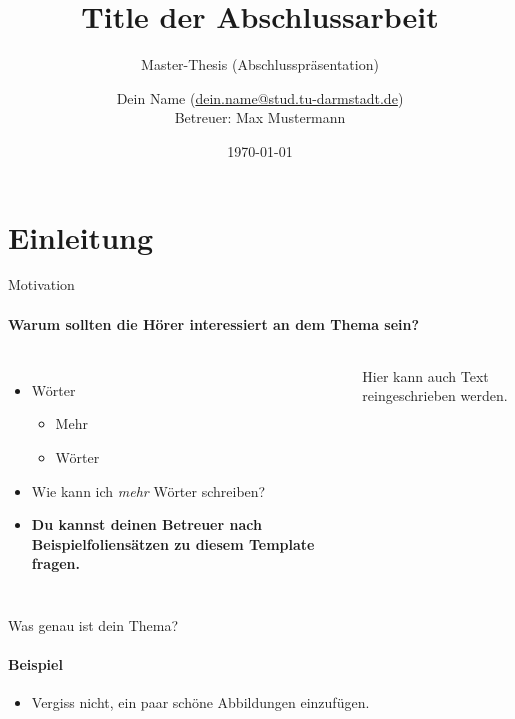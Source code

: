 \documentclass[
	german,%
	aspectratio=169,%
	accentcolor=1b,
	logo=true,%
	colorframetitle=true,%
	authorontitle=true,
	usepdftitle=false,
	design=2008,
	]{tudabeamer}
\title{Title der Abschlussarbeit}
\subtitle{Master-Thesis (Abschlusspräsentation)}
\author[Dein Name]{Dein Name \normalfont(\href{mailto:dein.name@stud.tu-darmstadt.de}{dein.name@stud.tu-darmstadt.de})\\
Betreuer: Max Mustermann
}
\institute[]{Fachgebiet Echtzeitsysteme} %
\date{\today}
\begin{document}
\maketitle

%
%

\section{Einleitung}

\begin{frame}{Motivation}
	\framesubtitle{Warum sollten die Hörer interessiert an dem Thema sein?}
	\label{motivation}
	
	\begin{columns}[onlytextwidth,c]
		\begin{itemize}
			\item Wörter
			\begin{itemize}
				\item Mehr
				\item Wörter
			\end{itemize}
			\vspace{1em}
		
			\item Wie kann ich \textit{mehr} Wörter schreiben?
			
			\item \textbf{Du kannst deinen Betreuer nach Beispielfoliensätzen zu diesem Template fragen.}
		\end{itemize}
	
		\vspace{-0.5em}
		Hier kann auch Text reingeschrieben werden.
	\end{columns}
\end{frame}

\begin{frame}{Was genau ist dein Thema?}
	\framesubtitle{Beispiel}
	\label{what-is-this}
	
	\begin{itemize}
		\item Vergiss nicht, ein paar schöne Abbildungen einzufügen.
	\end{itemize}
\end{frame}
\end{document}
